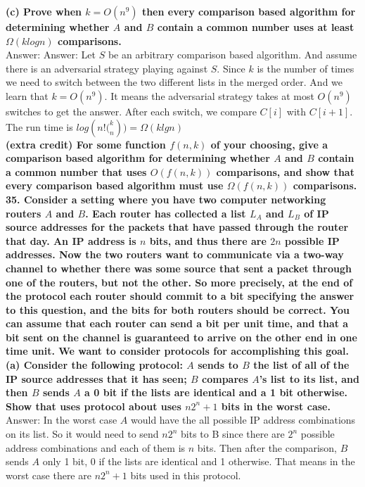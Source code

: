 \documentclass{article}
\begin{document}
\textbf{(c) Prove when $k = O(n^9)$ then every comparison based algorithm for determining
whether $A$ and $B$ contain a common number uses at least $\Omega(klogn)$ comparisons.} \\ \newline
Answer: Answer: Let $S$ be an arbitrary comparison based algorithm. And assume there is an adversarial strategy playing against $S$. Since $k$ is the number of times we need to switch between the two different lists in the merged order. And we learn that $k = O(n^9)$. It means the adversarial strategy takes at most $O(n^9)$ switches to get the answer. After each switch, we compare $C[i]$ with $C[i+1]$. The run time is $log(n!\big(_n^k)) = \Omega(klgn)$ \\ \newline
\textbf{(extra credit) For some function $f(n,k)$ of your choosing, give a comparison based algorithm for determining whether $A$ and $B$ contain a common number that uses $O(f(n,k))$ comparisons, and show that every comparison based algorithm must use $\Omega (f(n,k))$ comparisons.} \\ \newline
\textbf{35. Consider a setting where you have two computer networking routers $A$ and $B$. Each router has collected a list $L_A$ and $L_B$ of IP source addresses for the packets that have passed through the router that day. An IP address is $n$ bits, and thus there are $2n$ possible IP addresses. Now the two routers want to communicate via a two-way channel to whether there was some source that sent a packet through one of the routers, but not the other. So more precisely, at the end of the protocol each router should commit to a bit specifying the answer to this question, and the bits for both routers should be correct. You can assume that each router can send a bit per unit time, and that a bit sent on the channel is guaranteed to arrive on the other end in one time unit. We want to consider protocols for accomplishing this goal.} \\ \newline
\textbf{(a) Consider the following protocol: $A$ sends to $B$ the list of all of the IP source addresses that it has seen; $B$ compares $A$’s list to its list, and then $B$ sends $A$ a 0 bit if the lists are identical and a 1 bit otherwise. Show that uses protocol about uses $n2^n+1$ bits in the worst case.}\\ \newline
Answer: In the worst case $A$ would have the all possible IP address combinations on its list. So it would need to send $n2^n$ bits to B since there are $2^n$ possible address combinations and each of them is $n$ bits. Then after the comparison, $B$ sends $A$ only 1 bit, 0 if the lists are identical and 1 otherwise. That means in the worst case there are $n2^n + 1$ bits used in this protocol. \\ \newline
\end{document}
